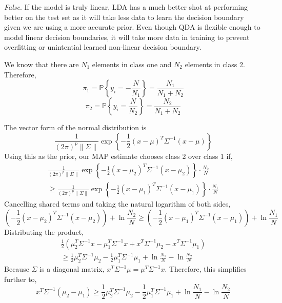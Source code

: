 \documentclass[12pt,twoside]{article}
\begin{document}
\begin{problems}
\begin{problemparts}
\problempart %

{\it False}. If the model is truly linear, LDA has a much better shot at
performing better on the test set as it will take less data to learn the
decision boundary given we are using a more accurate prior. Even though QDA
is flexible enough to model linear decision boundaries, it will take more
data in training to prevent overfitting or unintential learned non-linear
decision boundary.

\end{problemparts}

\newpage

\problem  %

\begin{problemparts}

\problempart %

We know that there are $N_1$ elements in class one and $N_2$ elements in
class 2. Therefore,
$$ \pi_1 = \mathbb{P}\left\{y_i = -\frac{N}{N_1}\right\} = \frac{N_1}{N_1 +
N_2} $$
$$ \pi_2 = \mathbb{P}\left\{y_i = \frac{N}{N_2}\right\} = \frac{N_2}{N_1 +
N_2} $$

\problempart %

The vector form of the normal distribution is
$$ \frac{1}{\left(2\pi\right)^p \lVert \Sigma \rVert} \exp
\left\{-\frac{1}{2} \left(x - \mu\right)^T \Sigma^{-1} \left(x -
\mu\right)\right\} $$
Using this as the prior, our MAP estimate chooses class 2 over class 1 if,
\begin{multline*}
    \frac{1}{\left(2\pi\right)^p \lVert \Sigma \rVert} \exp
    \left\{-\frac{1}{2} \left(x - \mu_2\right)^T \Sigma^{-1} \left(x -
    \mu_2\right)\right\} \cdot \frac{N_2}{N} \\
    \geq \frac{1}{\left(2\pi\right)^p \lVert \Sigma \rVert} \exp
    \left\{-\frac{1}{2} \left(x - \mu_1\right)^T \Sigma^{-1} \left(x -
    \mu_1\right)\right\} \cdot \frac{N_1}{N}
\end{multline*}
Cancelling shared terms and taking the natural logarithm of both sides,
$$\left(-\frac{1}{2} \left(x - \mu_2\right)^T \Sigma^{-1} \left(x -
\mu_2\right)\right) + \ln \frac{N_2}{N} \geq \left(-\frac{1}{2} \left(x -
\mu_1\right)^T \Sigma^{-1} \left(x - \mu_1\right)\right) + \ln \frac{N_1}{N} $$
Distributing the product,
\begin{multline*}
    \frac{1}{2} \left(\mu_2^T \Sigma^{-1} x - \mu_1^T \Sigma^{-1} x + x^T
    \Sigma^{-1} \mu_2 - x^T \Sigma^{-1} \mu_1\right) \\
    \geq \frac{1}{2} \mu_2^T \Sigma^{-1} \mu_2 - \frac{1}{2} \mu_1^T
    \Sigma^{-1} \mu_1 + \ln \frac{N_1}{N} - \ln \frac{N_2}{N}
\end{multline*}
Because $\Sigma$ is a diagonal matrix, $x^T \Sigma^{-1} \mu = \mu^T
\Sigma^{-1} x$. Therefore, this simplifies further to,
$$ x^T \Sigma^{-1} \left(\mu_2 - \mu_1\right) \geq \frac{1}{2} \mu_2^T
\Sigma^{-1} \mu_2 - \frac{1}{2} \mu_1^T \Sigma^{-1} \mu_1 + \ln \frac{N_1}{N}
- \ln \frac{N_2}{N} $$


\end{problemparts}
\end{problems}
\end{document}
